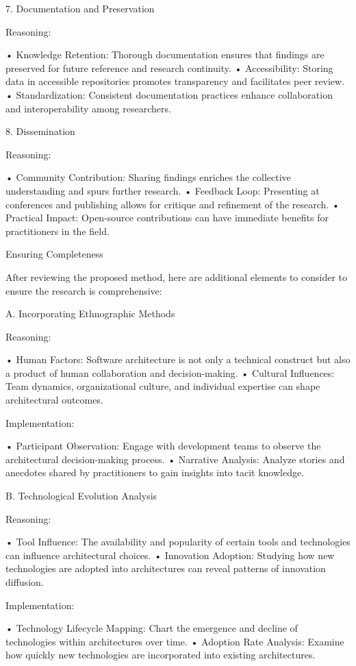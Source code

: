 7. Documentation and Preservation

Reasoning:

	•	Knowledge Retention: Thorough documentation ensures that findings are preserved for future reference and research continuity.
	•	Accessibility: Storing data in accessible repositories promotes transparency and facilitates peer review.
	•	Standardization: Consistent documentation practices enhance collaboration and interoperability among researchers.

8. Dissemination

Reasoning:

	•	Community Contribution: Sharing findings enriches the collective understanding and spurs further research.
	•	Feedback Loop: Presenting at conferences and publishing allows for critique and refinement of the research.
	•	Practical Impact: Open-source contributions can have immediate benefits for practitioners in the field.

Ensuring Completeness

After reviewing the proposed method, here are additional elements to consider to ensure the research is comprehensive:

A. Incorporating Ethnographic Methods

Reasoning:

	•	Human Factors: Software architecture is not only a technical construct but also a product of human collaboration and decision-making.
	•	Cultural Influences: Team dynamics, organizational culture, and individual expertise can shape architectural outcomes.

Implementation:

	•	Participant Observation: Engage with development teams to observe the architectural decision-making process.
	•	Narrative Analysis: Analyze stories and anecdotes shared by practitioners to gain insights into tacit knowledge.

B. Technological Evolution Analysis

Reasoning:

	•	Tool Influence: The availability and popularity of certain tools and technologies can influence architectural choices.
	•	Innovation Adoption: Studying how new technologies are adopted into architectures can reveal patterns of innovation diffusion.

Implementation:

	•	Technology Lifecycle Mapping: Chart the emergence and decline of technologies within architectures over time.
	•	Adoption Rate Analysis: Examine how quickly new technologies are incorporated into existing architectures.

